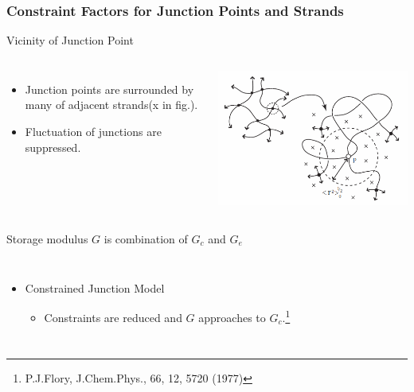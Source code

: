\documentclass[12pt, dvipdfmx]{beamer}
\begin{document}
\begin{frame}
	\frametitle{Constraint Factors for Junction Points and Strands}
		\vspace{-2mm}
		\begin{alertblock}{Vicinity of Junction Point}
			\begin{columns}[totalwidth=1\textwidth]
				\vspace{-3mm}
				\begin{itemize}
					\item Junction points are surrounded by many of \alert{adjacent strands(x in fig.).}
					\item %
					Fluctuation of junctions are \alert{suppressed}. 
				\end{itemize}
				\centering
				\includegraphics[width=\textwidth]{JP_vicinity.png}
			\end{columns}
		\end{alertblock}
		\vspace{-1mm}
		Storage modulus $G$ is \alert{combination of $G_c$ and $G_e$}
		\vspace{-1mm}
			\begin{columns}[totalwidth=1\textwidth]
				\begin{itemize}
					\item Constrained Junction Model
					\begin{itemize}
						\item Constraints are reduced and $G$ approaches to $G_c$.\footnote{\tiny{P.J.Flory, J.Chem.Phys., 66, 12, 5720 (1977)}}
					\end{itemize}

\end{itemize}
\end{columns}
\end{frame}
\end{document}
